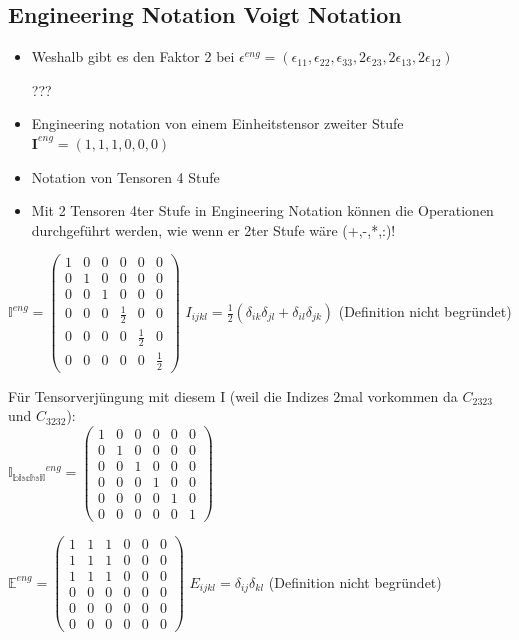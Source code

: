 \documentclass[a4paper, 10pt]{scrartcl}
\begin{document}
	
	\subsection{Engineering Notation Voigt Notation}
	\begin{itemize}
		\item Weshalb gibt es den Faktor 2 bei $ \epsilon^{eng}=(\epsilon_{11},\epsilon_{22},\epsilon_{33},2\epsilon_{23},2\epsilon_{13},2\epsilon_{12}) $
		
		???
		
		
		\item Engineering notation von einem Einheitstensor zweiter Stufe
		$ \textbf{I}^{eng}=(1,1,1,0,0,0) $
		
		
		\item Notation von Tensoren 4 Stufe
		\item Mit 2 Tensoren 4ter Stufe in Engineering Notation können die Operationen
		durchgeführt werden, wie wenn er 2ter Stufe wäre (+,-,*,:)!
		
	\end{itemize}
	$ \mathbb{I}^{eng}=
	\begin{pmatrix}
	1 & 0 & 0 & 0 & 0 & 0 \\ 
	0 & 1 & 0 & 0 & 0 & 0 \\ 
	0 & 0 & 1 & 0 & 0 & 0 \\ 
	0 & 0 & 0 & \frac{1}{2} & 0 & 0 \\ 
	0 & 0 & 0 & 0 & \frac{1}{2} & 0 \\ 
	0 & 0 & 0 & 0 & 0 & \frac{1}{2}
	\end{pmatrix} 
	$ $I_{ijkl} = \frac{1}{2} (\delta_{ik} \delta_{jl} + \delta_{il} \delta_{jk}) $
	(Definition nicht begründet)
	
	Für Tensorverjüngung mit diesem I (weil die Indizes 2mal vorkommen da $C_{2323}$
	und $C_{3232}$):\\
	$ \mathbb{I_{\text{bischsil}}}^{eng}=
	\begin{pmatrix}
	1 & 0 & 0 & 0 & 0 & 0 \\ 
	0 & 1 & 0 & 0 & 0 & 0 \\ 
	0 & 0 & 1 & 0 & 0 & 0 \\ 
	0 & 0 & 0 & 1 & 0 & 0 \\ 
	0 & 0 & 0 & 0 & 1 & 0 \\ 
	0 & 0 & 0 & 0 & 0 & 1
	\end{pmatrix}$
	
	$
	\mathbb{E}^{eng}=
	\begin{pmatrix}
	1 & 1 & 1 & 0 & 0 & 0 \\ 
	1 & 1 & 1 & 0 & 0 & 0 \\ 
	1 & 1 & 1 & 0 & 0 & 0 \\ 
	0 & 0 & 0 & 0 & 0 & 0 \\ 
	0 & 0 & 0 & 0 & 0 & 0 \\ 
	0 & 0 & 0 & 0 & 0 & 0
	\end{pmatrix} 
	$ $E_{ijkl} = \delta_{ij} \delta_{kl}$ (Definition nicht
	begründet)
	
\end{document}
